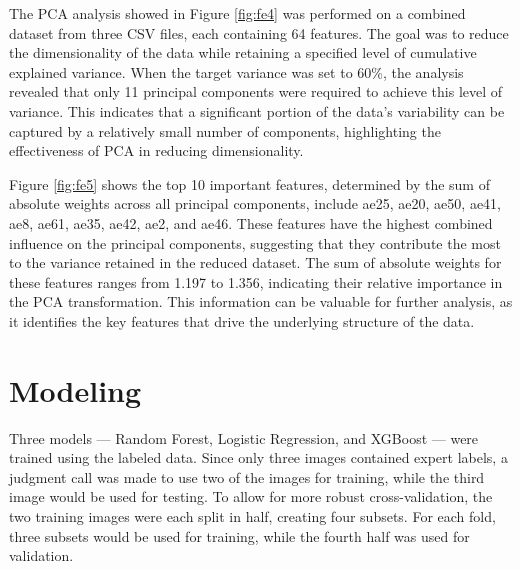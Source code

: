 \documentclass[11pt,letterpaper]{article}
\begin{document}

The PCA analysis showed in Figure \ref{fig:fe4} was performed on a combined dataset from three CSV files, each containing 64 features. The goal was to reduce the dimensionality of the data while retaining a specified level of cumulative explained variance. When the target variance was set to 60\%, the analysis revealed that only 11 principal components were required to achieve this level of variance. This indicates that a significant portion of the data's variability can be captured by a relatively small number of components, highlighting the effectiveness of PCA in reducing dimensionality.  


Figure \ref{fig:fe5} shows the top 10 important features, determined by the sum of absolute weights across all principal components, include ae25, ae20, ae50, ae41, ae8, ae61, ae35, ae42, ae2, and ae46. These features have the highest combined influence on the principal components, suggesting that they contribute the most to the variance retained in the reduced dataset. The sum of absolute weights for these features ranges from 1.197 to 1.356, indicating their relative importance in the PCA transformation. This information can be valuable for further analysis, as it identifies the key features that drive the underlying structure of the data.

\newpage
\section{Modeling}
\label{sec:model_data_split}
Three models --- Random Forest, Logistic Regression, and XGBoost --- were trained using the labeled data. Since only three images contained expert labels, a judgment call was made to use two of the images for training, while the third image would be used for testing. To allow for more robust cross-validation, the two training images were each split in half, creating four subsets. For each fold, three subsets would be used for training, while the fourth half was used for validation.
\end{document}
